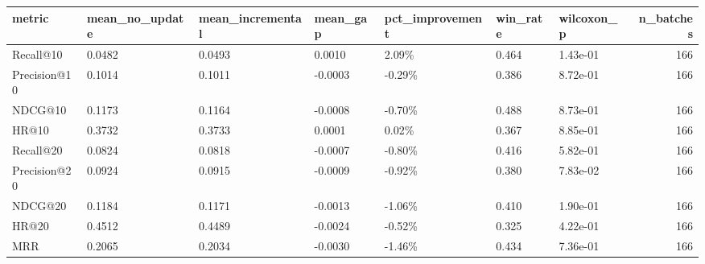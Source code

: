 \begin{tabular}{lllllllr}
\toprule
metric & mean_no_update & mean_incremental & mean_gap & pct_improvement & win_rate & wilcoxon_p & n_batches \\
\midrule
Recall@10 & 0.0482 & 0.0493 & 0.0010 & 2.09\% & 0.464 & 1.43e-01 & 166 \\
Precision@10 & 0.1014 & 0.1011 & -0.0003 & -0.29\% & 0.386 & 8.72e-01 & 166 \\
NDCG@10 & 0.1173 & 0.1164 & -0.0008 & -0.70\% & 0.488 & 8.73e-01 & 166 \\
HR@10 & 0.3732 & 0.3733 & 0.0001 & 0.02\% & 0.367 & 8.85e-01 & 166 \\
Recall@20 & 0.0824 & 0.0818 & -0.0007 & -0.80\% & 0.416 & 5.82e-01 & 166 \\
Precision@20 & 0.0924 & 0.0915 & -0.0009 & -0.92\% & 0.380 & 7.83e-02 & 166 \\
NDCG@20 & 0.1184 & 0.1171 & -0.0013 & -1.06\% & 0.410 & 1.90e-01 & 166 \\
HR@20 & 0.4512 & 0.4489 & -0.0024 & -0.52\% & 0.325 & 4.22e-01 & 166 \\
MRR & 0.2065 & 0.2034 & -0.0030 & -1.46\% & 0.434 & 7.36e-01 & 166 \\
\bottomrule
\end{tabular}
